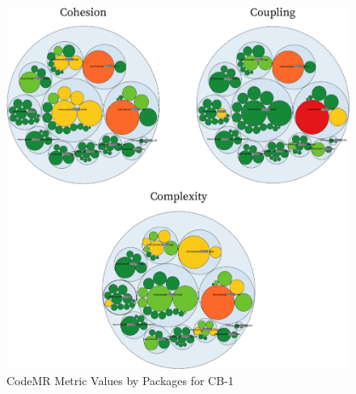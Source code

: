 \begin{figure}[ht!]
    \centering
    \includegraphics[scale=1.1]{figures/cb-1-package.png}
    \caption{CodeMR Metric Values by Packages for CB-1}
    \label{fig:cb-1-package}
\end{figure}
\FloatBarrier

